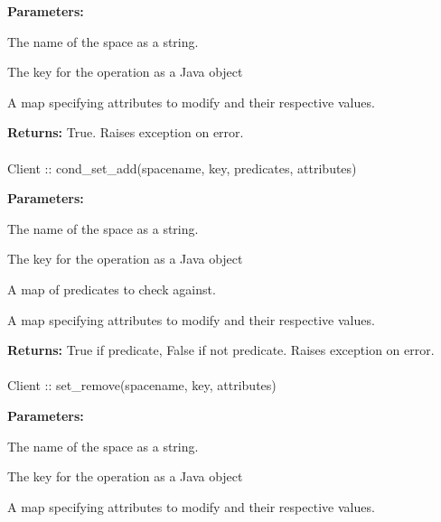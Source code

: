 \noindent\textbf{Parameters:}
\begin{description}[labelindent=\widthof{{\code{attributes}}},leftmargin=*,noitemsep,nolistsep,align=right]
\item[\code{spacename}] The name of the space as a string.
\item[\code{key}] The key for the operation as a Java object
\item[\code{attributes}] A map specifying attributes to modify and their respective values.
\end{description}

\noindent\textbf{Returns:}
True.  Raises exception on error.

\paragraph{}
\label{api:java:cond_set_add}
\begin{javacode}
Client :: cond_set_add(spacename, key, predicates, attributes)
\end{javacode}
\funcdesc 

\noindent\textbf{Parameters:}
\begin{description}[labelindent=\widthof{{\code{predicates}}},leftmargin=*,noitemsep,nolistsep,align=right]
\item[\code{spacename}] The name of the space as a string.
\item[\code{key}] The key for the operation as a Java object
\item[\code{predicates}] A map of predicates to check against.
\item[\code{attributes}] A map specifying attributes to modify and their respective values.
\end{description}

\noindent\textbf{Returns:}
True if predicate, False if not predicate.  Raises exception on error.

\paragraph{}
\label{api:java:set_remove}
\begin{javacode}
Client :: set_remove(spacename, key, attributes)
\end{javacode}
\funcdesc 

\noindent\textbf{Parameters:}
\begin{description}[labelindent=\widthof{{\code{attributes}}},leftmargin=*,noitemsep,nolistsep,align=right]
\item[\code{spacename}] The name of the space as a string.
\item[\code{key}] The key for the operation as a Java object
\item[\code{attributes}] A map specifying attributes to modify and their respective values.
\end{description}


